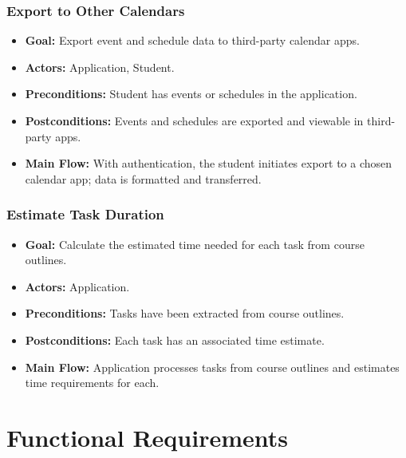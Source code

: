 \documentclass[12pt]{article}
\begin{document}
\subsubsection{Export to Other Calendars}
\begin{itemize}
    \item \textbf{Goal:} Export event and schedule data to third-party calendar apps.
    \item \textbf{Actors:} Application, Student.
    \item \textbf{Preconditions:} Student has events or schedules in the application.
    \item \textbf{Postconditions:} Events and schedules are exported and viewable in third-party apps.
    \item \textbf{Main Flow:} With authentication, the student initiates export to a chosen calendar app; data is formatted and transferred.
\end{itemize}

\subsubsection{Estimate Task Duration}
\begin{itemize}
    \item \textbf{Goal:} Calculate the estimated time needed for each task from course outlines.
    \item \textbf{Actors:} Application.
    \item \textbf{Preconditions:} Tasks have been extracted from course outlines.
    \item \textbf{Postconditions:} Each task has an associated time estimate.
    \item \textbf{Main Flow:} Application processes tasks from course outlines and estimates time requirements for each.
\end{itemize}


\section{Functional Requirements}
\end{document}
